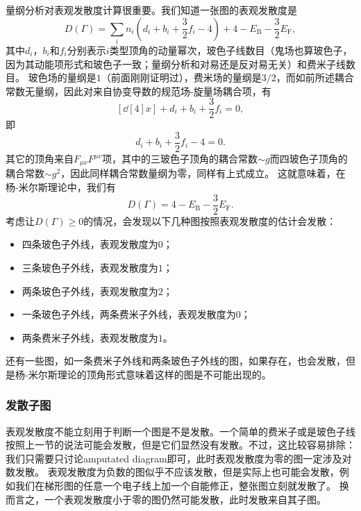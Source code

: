 量纲分析对表观发散度计算很重要。我们知道一张图的表观发散度是
\begin{equation}
    D(\Gamma) = \sum_i n_i \left( d_i + b_i + \frac{3}{2} f_i - 4  \right) + 4 - E_\text{B} - \frac{3}{2} E_\text{F},
\end{equation}
其中$d_i$，$b_i$和$f_i$分别表示$i$类型顶角的动量幂次，玻色子线数目（鬼场也算玻色子，因为其动能项形式和玻色子一致；量纲分析和对易还是反对易无关）和费米子线数目。
玻色场的量纲是$1$（前面刚刚证明过），费米场的量纲是$3/2$，而如前所述耦合常数无量纲，因此对来自协变导数的规范场-旋量场耦合项，有
\[
    [\dd[4]{x}] + d_i + b_i + \frac{3}{2} f_i = 0,
\]
即
\[
    d_i + b_i + \frac{3}{2} f_i - 4 = 0.
\]
其它的顶角来自$F_{\mu \nu} F^{\mu \nu}$项，其中的三玻色子顶角的耦合常数$\sim g$而四玻色子顶角的耦合常数$\sim g^2$，因此同样耦合常数量纲为零，同样有上式成立。
这就意味着，在杨-米尔斯理论中，我们有
\begin{equation}
    D(\Gamma) = 4 - E_\text{B} - \frac{3}{2} E_\text{F}.
\end{equation}
考虑让$D(\Gamma) \geq 0$的情况，会发现以下几种图按照表观发散度的估计会发散：
\begin{itemize}
    \item 四条玻色子外线，表观发散度为$0$；
    \item 三条玻色子外线，表观发散度为$1$；
    \item 两条玻色子外线，表观发散度为$2$；
    \item 一条玻色子外线，两条费米子外线，表观发散度为$0$；
    \item 两条费米子外线，表观发散度为$1$。
\end{itemize}
还有一些图，如一条费米子外线和两条玻色子外线的图，如果存在，也会发散，但是杨-米尔斯理论的顶角形式意味着这样的图是不可能出现的。

\subsubsection{发散子图}

表观发散度不能立刻用于判断一个图是不是发散。一个简单的费米子或是玻色子线按照上一节的说法可能会发散，但是它们显然没有发散。不过，这比较容易排除：我们只需要只讨论amputated diagram即可，此时表观发散度为零的图一定涉及对数发散。
表观发散度为负数的图似乎不应该发散，但是实际上也可能会发散，例如我们在梯形图的任意一个电子线上加一个自能修正，整张图立刻就发散了。
换而言之，一个表观发散度小于零的图仍然可能发散，此时发散来自其子图。

